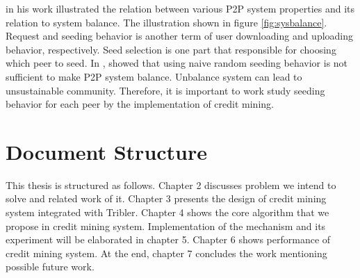 \citeauthor{2011:managesupplydemand:meulpolder} in his work illustrated the relation between various P2P system properties and its relation to system balance. The illustration shown in figure \ref{fig:sysbalance}. Request and seeding behavior is another term of user downloading and uploading behavior, respectively. Seed selection is one part that responsible for choosing which peer to seed. In \cite{2011:managesupplydemand:meulpolder}, \citeauthor{2011:managesupplydemand:meulpolder} showed that using naive random seeding behavior is not sufficient to make P2P system balance. Unbalance system can lead to unsustainable community. Therefore, it is important to work study seeding behavior for each peer by the implementation of credit mining.

\section{Document Structure}
This thesis is structured as follows. Chapter 2 discusses problem we intend to solve and related work of it. Chapter 3 presents the design of credit mining system integrated with Tribler. Chapter 4 shows the core algorithm that we propose in credit mining system. Implementation of the mechanism and its experiment will be elaborated in chapter 5. Chapter 6 shows performance of credit mining system. At the end, chapter 7 concludes the work mentioning possible future work.


